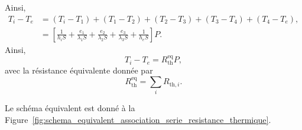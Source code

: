         Ainsi,
        \begin{align*}
            T_i-T_e
            &=
            (T_i-T_1)+(T_1-T_2)+(T_2-T_3)+(T_3-T_4)+(T_4-T_e),\\
            &=\left[
                \frac{1}{h_i S}+\frac{e_1}{\lambda_1 S}+\frac{e_2}{\lambda_2 S}+\frac{e_3}{\lambda_3 S}+\frac{1}{h_e S}
            \right]P.
        \end{align*}
        Ainsi,
        \begin{equation*}
            T_i-T_e=R_{\text{th}}^{\text{eq}}P,
        \end{equation*}
        avec la résistance équivalente donnée par
        \begin{equation*}
            \boxed{
                R_{\text{th}}^{\text{eq}}=\sum_{i}R_{\text{th},i}.
            }
        \end{equation*}

        Le schéma équivalent est donné à la Figure~\ref{fig:schema_equivalent_association_serie_resistance_thermique}.

